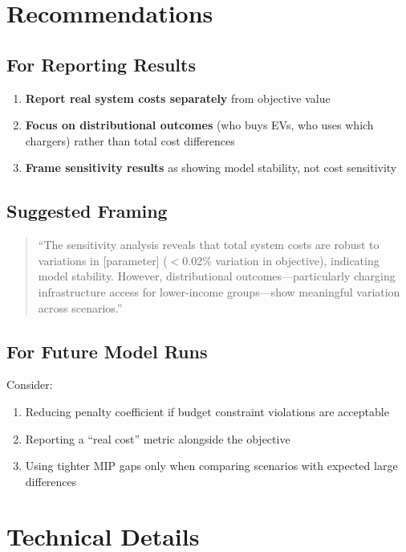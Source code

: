\documentclass[11pt,a4paper]{article}
\begin{document}
\section{Recommendations}

\subsection{For Reporting Results}

\begin{enumerate}
    \item \textbf{Report real system costs separately} from objective value
    \item \textbf{Focus on distributional outcomes} (who buys EVs, who uses which chargers) rather than total cost differences
    \item \textbf{Frame sensitivity results} as showing model stability, not cost sensitivity
\end{enumerate}

\subsection{Suggested Framing}

\begin{quote}
``The sensitivity analysis reveals that total system costs are robust to variations in [parameter] ($<$0.02\% variation in objective), indicating model stability. However, distributional outcomes---particularly charging infrastructure access for lower-income groups---show meaningful variation across scenarios.''
\end{quote}

\subsection{For Future Model Runs}

Consider:
\begin{enumerate}
    \item Reducing penalty coefficient if budget constraint violations are acceptable
    \item Reporting a ``real cost'' metric alongside the objective
    \item Using tighter MIP gaps only when comparing scenarios with expected large differences
\end{enumerate}

\section{Technical Details}
\end{document}
